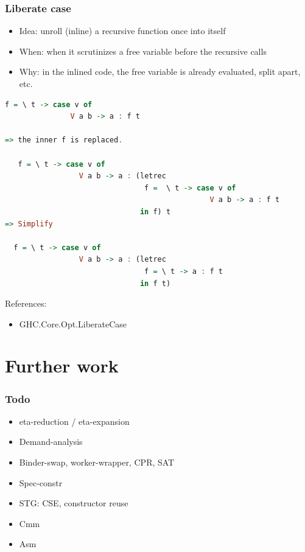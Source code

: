 \documentclass[aspectratio=169]{beamer}
\begin{document}
\begin{frame}[fragile]
  \frametitle{Liberate case}

  \begin{itemize}
    \item Idea: unroll (inline) a recursive function once into itself
    \item When: when it scrutinizes a free variable before the recursive calls
    \item Why: in the inlined code, the free variable is already evaluated,
      split apart, etc.
  \end{itemize}

  \begin{lstlisting}[language=haskell,basicstyle=\tiny]
   f = \ t -> case v of
               V a b -> a : f t

=> the inner f is replaced.

   f = \ t -> case v of
                 V a b -> a : (letrec
                                f =  \ t -> case v of
                                               V a b -> a : f t
                               in f) t
=> Simplify

  f = \ t -> case v of
                 V a b -> a : (letrec
                                f = \ t -> a : f t
                               in f t)
\end{lstlisting}


  References:
  \begin{itemize}
    \item GHC.Core.Opt.LiberateCase
  \end{itemize}
\end{frame}

\section{Further work}

\begin{frame}
  \frametitle{Todo}

  \begin{itemize}
    \item eta-reduction / eta-expansion
    \item Demand-analysis
    \item Binder-swap, worker-wrapper, CPR, SAT
    \item Spec-constr
    \item STG: CSE, constructor reuse
    \item Cmm
    \item Asm
  \end{itemize}

\end{frame}
\end{document}

